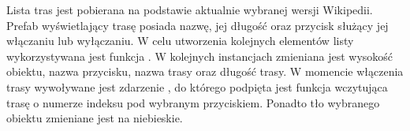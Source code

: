 Lista tras jest pobierana na podstawie aktualnie wybranej wersji Wikipedii. Prefab wyświetlający trasę posiada nazwę, jej długość oraz przycisk służący jej włączaniu lub wyłączaniu. W celu utworzenia kolejnych elementów listy wykorzystywana jest funkcja . W kolejnych instancjach zmieniana jest wysokość obiektu, nazwa przycisku, nazwa trasy oraz długość trasy. W momencie włączenia trasy wywoływane jest zdarzenie , do którego podpięta jest funkcja  wczytująca trasę o numerze indeksu pod wybranym przyciskiem. Ponadto tło wybranego obiektu zmieniane jest na niebieskie.
